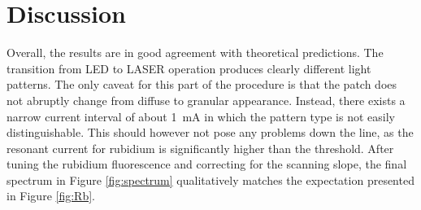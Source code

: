 \section{Discussion}
\label{sec:discussion}

Overall, the results are in good agreement with theoretical predictions. The transition from LED to LASER operation
produces clearly different light patterns. The only caveat for this part of the procedure is that the patch does not
abruptly change from diffuse to granular appearance. Instead, there exists a narrow current interval of about
\qty{1}{\milli\ampere} in which the pattern type is not easily distinguishable. This should however not pose any problems
down the line, as the resonant current for rubidium is significantly higher than the threshold. After tuning the rubidium
fluorescence and correcting for the scanning slope, the final spectrum in Figure \ref{fig:spectrum} qualitatively matches
the expectation presented in Figure \ref{fig:Rb}.

